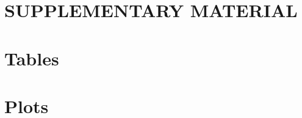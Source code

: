 \documentclass[a4paper,12pt]{article}
\begin{document}
\section*{SUPPLEMENTARY MATERIAL}
\appendix

\section{\fontsize{12}{12}\selectfont Tables}
\label{AppendixA}

\clearpage

\section{\fontsize{12}{12}\selectfont Plots}
\label{AppendixB}

\clearpage

\end{document}
